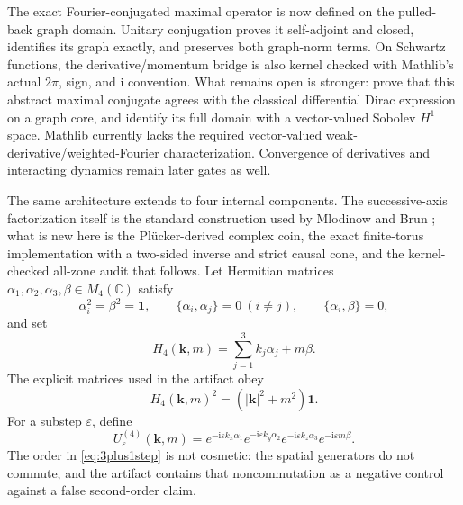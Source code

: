 \documentclass[11pt]{article}
\newcommand{\ii}{\mathrm{i}}
\newcommand{\C}{\mathbb{C}}
\newcommand{\id}{\mathbf{1}}
\begin{document}
  The exact Fourier-conjugated maximal operator is now defined on the pulled-back
  graph domain.  Unitary conjugation proves it self-adjoint and closed, identifies
  its graph exactly, and preserves both graph-norm terms.  On Schwartz functions,
  the derivative/momentum bridge is also kernel checked with Mathlib's actual
  $2\pi$, sign, and $\ii$ convention.  What remains open is stronger: prove that
  this abstract maximal conjugate agrees with the classical differential Dirac
  expression on a graph core, and identify its full domain with a vector-valued
  Sobolev $H^1$ space.  Mathlib currently lacks the required vector-valued
  weak-derivative/weighted-Fourier characterization.  Convergence of derivatives
  and interacting dynamics remain later gates as well.

The same architecture extends to four internal components.  The
successive-axis factorization itself is the standard construction used by
Mlodinow and Brun \cite{MlodinowBrun}; what is new here is the
Pl\"ucker-derived complex coin, the exact finite-torus implementation with a
two-sided inverse and strict causal cone, and the kernel-checked all-zone
audit that follows.  Let Hermitian
matrices $\alpha_1,\alpha_2,\alpha_3,\beta\in M_4(\C)$ satisfy
\[
 \alpha_i^2=\beta^2=\id,
 \qquad \{\alpha_i,\alpha_j\}=0\ (i\neq j),
 \qquad \{\alpha_i,\beta\}=0,
\]
and set
\[
 H_4(\mathbf k,m)=\sum_{j=1}^3k_j\alpha_j+m\beta.
\]
The explicit matrices used in the artifact obey
\begin{equation}\label{eq:H4square}
 H_4(\mathbf k,m)^2=(|\mathbf k|^2+m^2)\id.
\end{equation}
For a substep $\varepsilon$, define
\begin{equation}\label{eq:3plus1step}
 U^{(4)}_\varepsilon(\mathbf k,m)
 =e^{-\ii\varepsilon k_x\alpha_1}
  e^{-\ii\varepsilon k_y\alpha_2}
  e^{-\ii\varepsilon k_z\alpha_3}
  e^{-\ii\varepsilon m\beta}.
\end{equation}
The order in \eqref{eq:3plus1step} is not cosmetic: the spatial generators do
not commute, and the artifact contains that noncommutation as a negative
control against a false second-order claim.
\end{document}

